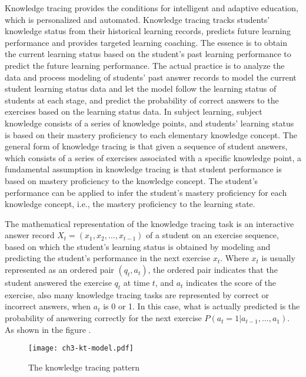 Knowledge tracing provides the conditions for intelligent and adaptive education, which is personalized and automated. Knowledge tracing tracks students' knowledge status from their historical learning records, predicts future learning performance and provides targeted learning coaching. The essence is to obtain the current learning status based on the student's past learning performance to predict the future learning performance. The actual practice is to analyze the data and process modeling of students' past answer records to model the current student learning status data and let the model follow the learning status of students at each stage, and predict the probability of correct answers to the exercises based on the learning status data. In subject learning, subject knowledge consists of a series of knowledge points, and students' learning status is based on their mastery proficiency to each elementary knowledge concept. The general form of knowledge tracing is that given a sequence of student answers, which consists of a series of exercises associated with a specific knowledge point, a fundamental assumption in knowledge tracing is that student performance is based on mastery proficiency to the knowledge concept. The student's performance can be applied to infer the student's mastery proficiency for each knowledge concept, i.e., the mastery proficiency to the learning state.

The mathematical representation of the knowledge tracing task is an interactive answer record \(X_t=(x_1,x_2,\ldots,x_{t-1})\) of a student on an exercise sequence, based on which the student's learning status is obtained by modeling and predicting the student's performance in the next exercise \(x_{t}\). Where \(x_t\) is usually represented as an ordered pair \((q_t,a_t)\), the ordered pair indicates that the student answered the exercise \(q_t\) at time \(t\), and \(a_t\) indicates the score of the exercise, also many knowledge tracing tasks are represented by correct or incorrect answers, when \(a_t\) is 0 or 1. In this case, what is actually predicted is the probability of answering correctly for the next exercise \(P(a_{t}=1|a_{t-1},\ldots,a_1)\). As shown in the figure \figname{\ref{fig:ch3-model-ktdes}}.

\begin{figure}[htbp!]
    \texttt{[image: ch3-kt-model.pdf]}
    \caption{The knowledge tracing pattern}\label{fig:ch3-model-ktdes}
\end{figure}


